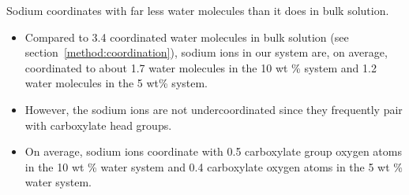 \documentclass{article}
\begin{document}
  \noindent Sodium coordinates with far less water molecules than it does in 
  bulk solution.
  \begin{itemize}
    \item Compared to 3.4 coordinated water molecules in bulk solution (see 
    section~\ref{method:coordination}), sodium ions in our system are, on average,
    coordinated to about 1.7 water molecules in the 10 wt \% system and 1.2 water
    molecules in the 5 wt\% system.
    \item However, the sodium ions are not undercoordinated since they frequently 
    pair with carboxylate head groups.
    \item On average, sodium ions coordinate with 0.5 carboxylate group oxygen atoms in the
    10 wt \% water system and 0.4 carboxylate oxygen atoms in the 5 wt \% water system. 
  \end{itemize}
  
  
\end{document}
